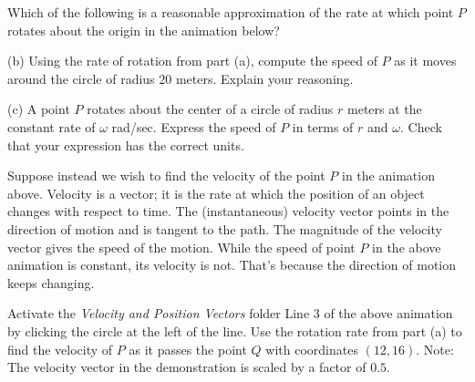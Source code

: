 \documentclass{ximera}
\begin{document}
\begin{exploration}  \label{Qdstsdfgf:Cross}

\begin{question}   \label{Qdfg4bk:Cross}
Which of the following is a reasonable approximation of the rate at which point $P$ rotates about the origin in the animation below?
\begin{multipleChoice}  
\end{multipleChoice}  
\end{question}


(b) Using the rate of rotation from part (a), compute the speed of $P$ as it moves around the circle of radius $20$ meters. Explain your reasoning.

(c) A point $P$ rotates about the center of a circle of radius $r$ meters at the constant rate of $\omega$ rad/sec. Express the speed of $P$ in terms of $r$ and $\omega$. Check that your expression has the correct units.

 
\begin{onlineOnly}
    \begin{center}
\end{center}
\end{onlineOnly}


Suppose instead we wish to find the velocity of the point $P$ in the animation above. Velocity is a vector; it is the rate at which the position of an object changes with respect to time. The (instantaneous) velocity vector points in the direction of motion and is  tangent to the path. The magnitude of the velocity vector gives the speed of the motion. While the speed of point $P$ in the above animation is constant, its velocity is not. That's because the direction of motion keeps changing.

\begin{question}   \label{Q3456457l:Cross}
Activate the {\it Velocity and Position Vectors} folder Line 3 of the above animation by clicking the circle at the left of the line. Use the rotation rate from part (a) to find the velocity of $P$ as it passes the point $Q$ with coordinates $(12,16)$. Note: The velocity vector in the demonstration is scaled by a factor of $0.5$.
\end{question}

\end{exploration}
\end{document}
